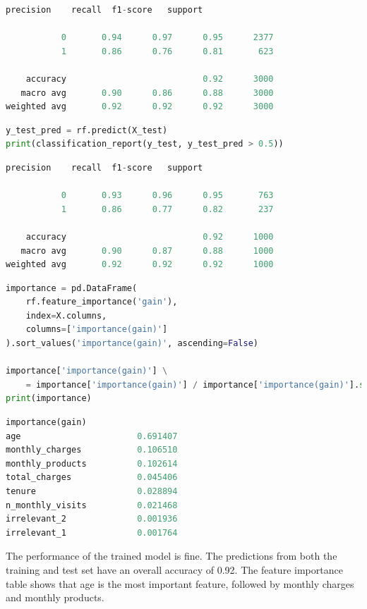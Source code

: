 \documentclass{article}
\begin{document}
\begin{lstlisting}[language=Python,numbers=none]
              precision    recall  f1-score   support

           0       0.94      0.97      0.95      2377
           1       0.86      0.76      0.81       623

    accuracy                           0.92      3000
   macro avg       0.90      0.86      0.88      3000
weighted avg       0.92      0.92      0.92      3000
\end{lstlisting}

\begin{lstlisting}[language=Python]
y_test_pred = rf.predict(X_test)
print(classification_report(y_test, y_test_pred > 0.5))
\end{lstlisting}

\begin{lstlisting}[language=Python,numbers=none]
              precision    recall  f1-score   support

           0       0.93      0.96      0.95       763
           1       0.86      0.77      0.82       237

    accuracy                           0.92      1000
   macro avg       0.90      0.87      0.88      1000
weighted avg       0.92      0.92      0.92      1000
\end{lstlisting}

\begin{lstlisting}[language=Python]
importance = pd.DataFrame(
    rf.feature_importance('gain'),
    index=X.columns, 
    columns=['importance(gain)']
).sort_values('importance(gain)', ascending=False)

importance['importance(gain)'] \
    = importance['importance(gain)'] / importance['importance(gain)'].sum()
print(importance)
\end{lstlisting}

\begin{lstlisting}[language=Python,numbers=none]
                  importance(gain)
age                       0.691407
monthly_charges           0.106510
monthly_products          0.102614
total_charges             0.045406
tenure                    0.028894
n_monthly_visits          0.021468
irrelevant_2              0.001936
irrelevant_1              0.001764
\end{lstlisting}

The performance of the trained model is fine. The predictions from both the training and test set have an overall accuracy of 0.92. The feature importance table shows that age is the most important feature, followed by monthly charges and monthly products.
\end{document}
